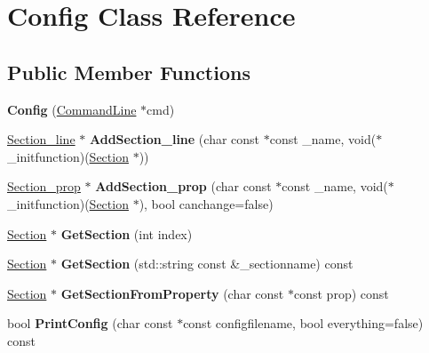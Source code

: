\hypertarget{classConfig}{\section{Config Class Reference}
\label{classConfig}
}
\subsection*{Public Member Functions}
\begin{DoxyCompactItemize}
\item 
\hypertarget{classConfig_a526e7d065ca0a508ff66e18d9efdeda1}{{\bfseries Config} (\hyperlink{classCommandLine}{Command\-Line} $\ast$cmd)}\label{classConfig_a526e7d065ca0a508ff66e18d9efdeda1}

\item 
\hypertarget{classConfig_a349dde11601cfbce032a22bdf40a7a0e}{\hyperlink{classSection__line}{Section\-\_\-line} $\ast$ {\bfseries Add\-Section\-\_\-line} (char const $\ast$const \-\_\-name, void($\ast$\-\_\-initfunction)(\hyperlink{classSection}{Section} $\ast$))}\label{classConfig_a349dde11601cfbce032a22bdf40a7a0e}

\item 
\hypertarget{classConfig_adf0d4f814205a26175b45e78030c4fb7}{\hyperlink{classSection__prop}{Section\-\_\-prop} $\ast$ {\bfseries Add\-Section\-\_\-prop} (char const $\ast$const \-\_\-name, void($\ast$\-\_\-initfunction)(\hyperlink{classSection}{Section} $\ast$), bool canchange=false)}\label{classConfig_adf0d4f814205a26175b45e78030c4fb7}

\item 
\hypertarget{classConfig_aaa43fc4ab06486c38da9e398476c9e67}{\hyperlink{classSection}{Section} $\ast$ {\bfseries Get\-Section} (int index)}\label{classConfig_aaa43fc4ab06486c38da9e398476c9e67}

\item 
\hypertarget{classConfig_a873c20a35c7320de62b6ad759b825302}{\hyperlink{classSection}{Section} $\ast$ {\bfseries Get\-Section} (std\-::string const \&\-\_\-sectionname) const }\label{classConfig_a873c20a35c7320de62b6ad759b825302}

\item 
\hypertarget{classConfig_a385da89652978d2ddfd6102cf6ecc3c3}{\hyperlink{classSection}{Section} $\ast$ {\bfseries Get\-Section\-From\-Property} (char const $\ast$const prop) const }\label{classConfig_a385da89652978d2ddfd6102cf6ecc3c3}

\item 
\hypertarget{classConfig_a5358d65e6687f76a7856aae7b5bf0c5c}{bool {\bfseries Print\-Config} (char const $\ast$const configfilename, bool everything=false) const }\label{classConfig_a5358d65e6687f76a7856aae7b5bf0c5c}


\end{DoxyCompactItemize}
